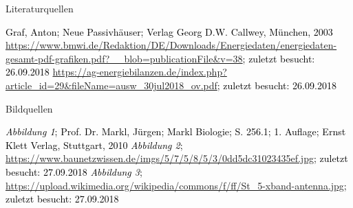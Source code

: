 \documentclass[11pt]{beamer}
\begin{document}
\begin{frame}{Literaturquellen}
\begin{thebibliography}{9}
\textcolor{black}{
Graf, Anton; Neue Passivhäuser; Verlag Georg D.W. Callwey, München, 2003}
\textcolor{black}{\url{https://www.bmwi.de/Redaktion/DE/Downloads/Energiedaten/energiedaten-gesamt-pdf-grafiken.pdf?__blob=publicationFile&v=38}; zuletzt besucht: 26.09.2018}
\textcolor{black}{
\url{https://ag-energiebilanzen.de/index.php?article_id=29&fileName=ausw_30jul2018_ov.pdf}; zuletzt besucht: 26.09.2018}
\end{thebibliography}
\end{frame}

\begin{frame}{Bildquellen}
\begin{thebibliography}{9}
\textcolor{black}{
\textit{Abbildung 1}; Prof. Dr. Markl, Jürgen; Markl Biologie; S. 256.1; 1. Auflage; Ernst Klett Verlag, Stuttgart, 2010}
\textcolor{black}{
\textit{Abbildung 2}; \url{https://www.baunetzwissen.de/imgs/5/7/5/8/5/3/0dd5dc31023435ef.jpg}; zuletzt besucht: 27.09.2018}
\textcolor{black}{
\textit{Abbildung 3}; \url{https://upload.wikimedia.org/wikipedia/commons/f/ff/St_5-xband-antenna.jpg}; zuletzt besucht: 27.09.2018}
\end{thebibliography}
\end{frame}
\end{document}
